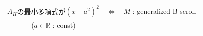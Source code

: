 \documentclass[dvipdfmx, xcolor=svgnames]{beamer}
\theoremstyle{plain}
\theoremstyle{definition}
\theoremstyle{remark}
\renewcommand{\arraystretch}{1.1}
\begin{document}
{\begin{theorem}
\begin{table}
  \begin{tabular}{cll}
    \(A_H\)の最小多項式が\((x-a^2)^2\)
    & \hspace{3pt}\(\Leftrightarrow\)
    & \(M\) : generalized B-scroll\\
    (\(a\in \mathbb{R}\) : const)
    &
    &
  \end{tabular}
\end{table}
\vspace{-5pt}
\end{theorem}
}
\end{document}
